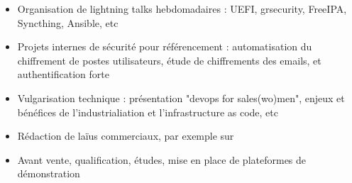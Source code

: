 \documentclass[10pt,a4paper]{moderncv}
\begin{document}
{\begin{itemize}
    \item Organisation de lightning talks hebdomadaires : UEFI, grsecurity,
      FreeIPA, Syncthing, Ansible, etc
    \item Projets internes de sécurité pour référencement : automatisation du
      chiffrement de postes utilisateurs, étude de chiffrements des emails, et
      authentification forte
    \item Vulgarisation technique : présentation "devops for sales(wo)men",
      enjeux et bénéfices de l'industrialiation et l'infrastructure as code,
      etc
    \item Rédaction de laïus commerciaux, par exemple sur
    \item Avant vente, qualification, études, mise en place de plateformes
      de démonstration
  \end{itemize}
}
\end{document}
